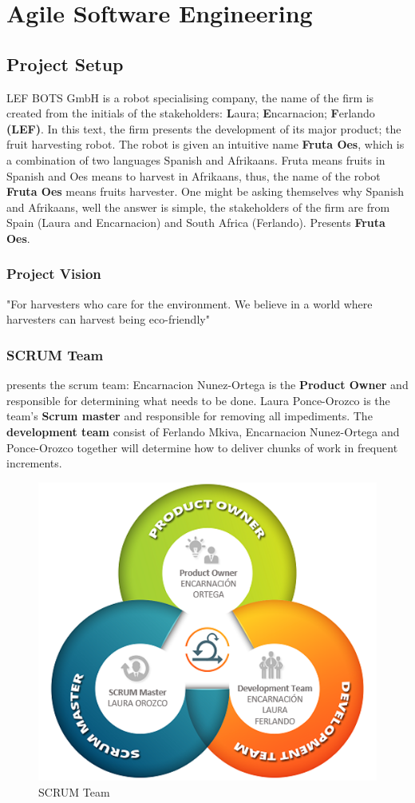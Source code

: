 \newpage
\section{Agile Software Engineering}\label{sec:softwareEngineering}
\subsection{Project Setup} \label{sec:projectSetup}
\noindent LEF BOTS GmbH is a robot specialising company, the name of the firm is created from the initials of the stakeholders: \textbf{L}aura; \textbf{E}ncarnacion; \textbf{F}erlando \textbf{(LEF)}. In this text, the firm presents the development of its major product; the fruit harvesting robot. The robot is given an intuitive name \textbf{Fruta Oes}, which is a combination of two languages Spanish and Afrikaans. Fruta means fruits in Spanish and Oes means to harvest in Afrikaans, thus, the name of the robot \textbf{Fruta Oes} means fruits harvester. One might be asking themselves why Spanish and Afrikaans, well the answer is simple, the stakeholders of the firm are from Spain (Laura and Encarnacion) and South Africa (Ferlando).  Presents \textbf{Fruta Oes}. 

\subsubsection{Project Vision}

"For harvesters who care for the environment. We believe in a world where harvesters can harvest being eco-friendly" 


\subsubsection{SCRUM Team}
\noindent {} presents the scrum team: Encarnacion Nunez-Ortega is the \textbf{Product Owner} and responsible for determining what needs to be done. Laura Ponce-Orozco is the team's \textbf{Scrum master} and responsible for removing all impediments. The \textbf{development team} consist of Ferlando Mkiva, Encarnacion Nunez-Ortega and Ponce-Orozco together will determine how to deliver chunks of work in frequent increments.
\begin{figure}[!ht]
	\centering
	\includegraphics[width=0.6\linewidth]{Graphics/scrumTeam}
	\caption{SCRUM Team}
	\label{fig:scrumTeam}
\end{figure}


